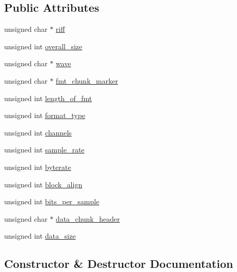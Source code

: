 \subsection*{Public Attributes}
\begin{DoxyCompactItemize}
\item 
unsigned char $\ast$ \hyperlink{structbridges_1_1_wave_header_a07827c91c0aba0a8a16789d2254864ab}{riff}
\item 
unsigned int \hyperlink{structbridges_1_1_wave_header_a011c1748d68b850b3c46ebaf2f9fafb7}{overall\+\_\+size}
\item 
unsigned char $\ast$ \hyperlink{structbridges_1_1_wave_header_aec8394e69b5f89efa30f6cac722dc8b8}{wave}
\item 
unsigned char $\ast$ \hyperlink{structbridges_1_1_wave_header_a0ad6e8b0e3cd8aa6c436c2d31318732d}{fmt\+\_\+chunk\+\_\+marker}
\item 
unsigned int \hyperlink{structbridges_1_1_wave_header_a886a118d4fb80b91e397479526683199}{length\+\_\+of\+\_\+fmt}
\item 
unsigned int \hyperlink{structbridges_1_1_wave_header_a3051a4577e1910f458306ff1c6d46d2d}{format\+\_\+type}
\item 
unsigned int \hyperlink{structbridges_1_1_wave_header_aa26100ecfc0b070bb2c333d39c57b50d}{channels}
\item 
unsigned int \hyperlink{structbridges_1_1_wave_header_a5dc65cbc1d601a5e613a4512f8add13f}{sample\+\_\+rate}
\item 
unsigned int \hyperlink{structbridges_1_1_wave_header_a3cba1c387f8133f872bf2529a3f73594}{byterate}
\item 
unsigned int \hyperlink{structbridges_1_1_wave_header_a56bc86e077b8867c0d6e1d669cc3ebcc}{block\+\_\+align}
\item 
unsigned int \hyperlink{structbridges_1_1_wave_header_a84a75f163bd254d4a17bc250a33cc6d7}{bits\+\_\+per\+\_\+sample}
\item 
unsigned char $\ast$ \hyperlink{structbridges_1_1_wave_header_ae00698ce5073c47cd62ac8b447ec772f}{data\+\_\+chunk\+\_\+header}
\item 
unsigned int \hyperlink{structbridges_1_1_wave_header_ab3ec19af6d3e3ef6badb8dbc2f9b4cae}{data\+\_\+size}
\end{DoxyCompactItemize}


\subsection{Constructor \& Destructor Documentation}
\mbox{\label{structbridges_1_1_wave_header_a5d6c15721015aeb83eab90e688306caa}} 

